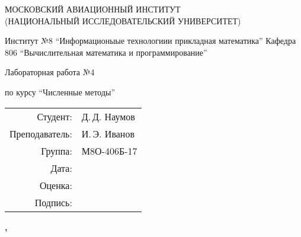 \begin{titlepage}
\begin{spacing}{1.2}
\begin{center}
{\large 
МОСКОВСКИЙ АВИАЦИОННЫЙ ИНСТИТУТ\\ 
(НАЦИОНАЛЬНЫЙ ИССЛЕДОВАТЕЛЬСКИЙ УНИВЕРСИТЕТ)
}
\vspace{24pt}

{\large
Институт №8 \enquote{Информационыые технологиии прикладная математика}
}
{\large
Кафедра 806 \enquote{Вычислительная математика и программирование}
}
\vspace{96pt}

\bfseries
{\Large
Лабораторная работа №4

по курсу \enquote{Численные методы}
}

\end{center}

\vspace{72pt}

\begin{flushright}
\begin{tabular}{r l}
    \large Студент: & \large Д.\,Д. Наумов \\
    \large Преподаватель: & \large И.\,Э. Иванов \\
    \large Группа: \large & М8О-406Б-17 \\
    \large Дата: & \\
    \large Оценка: & \\
    \large Подпись: & \\
\end{tabular}
\end{flushright}

\vfill

\begin{center}
\bfseries
{}, \the\year
\end{center}
\end{spacing}
\end{titlepage}

\pagebreak
